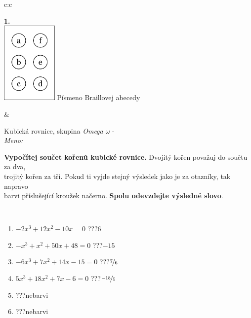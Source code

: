 \documentclass[10pt]{report}
\begin{document}
\begin{tabular}{c:c}
\begin{minipage}[c][104.5mm][t]{0.5\linewidth}
\begin{center}
\begin{minipage}{0.20\linewidth}
\begin{center}
{\Huge\bfseries 1.} \\[2mm]
\includegraphics[height=40mm]{../images/braille.png}
{\small Písmeno Braillovej abecedy}
\end{center}
\end{minipage}
\end{center}
\end{minipage}
&
\begin{minipage}[c][104.5mm][t]{0.5\linewidth}
\begin{center}
\vspace{7mm}
{\huge Kubická rovnice, skupina \textit{Omega $\omega$} -}\\[5mm]
\textit{Meno:}\phantom{xxxxxxxxxxxxxxxxxxxxxxxxxxxxxxxxxxxxxxxxxxxxxxxxxxxxxxxxxxxxxxxxx}\\[5mm]
\begin{minipage}{0.95\linewidth}
\textbf{Vypočítej součet kořenů kubické rovnice.} Dvojitý kořen považuj do součtu za dva,\\trojitý kořen za tři. Pokud ti vyjde stejný výsledek jako je za otazníky, tak napravo\\barvi příslušející kroužek načerno. \textbf{Spolu odevzdejte výsledné slovo}.
\end{minipage}
\\[1mm]
\begin{minipage}{0.79\linewidth}
\begin{center}
\begin{varwidth}{\linewidth}
\begin{enumerate}
\Large
\item $-2x^3+12x^2-10x=0$\quad \dotfill\; ???\;\dotfill \quad $6$
\item $-x^3+x^2+50x+48=0$\quad \dotfill\; ???\;\dotfill \quad $-15$
\item $-6x^3+7x^2+14x-15=0$\quad \dotfill\; ???\;\dotfill \quad $\nicefrac{7}{6}$
\item $5x^3+18x^2+7x-6=0$\quad \dotfill\; ???\;\dotfill \quad $\nicefrac{-18}{5}$
\item \quad \dotfill\; ???\;\dotfill \quad nebarvi
\item \quad \dotfill\; ???\;\dotfill \quad nebarvi

\end{enumerate}
\end{varwidth}
\end{center}
\end{minipage}
\end{center}
\end{minipage}
\end{tabular}
\end{document}
